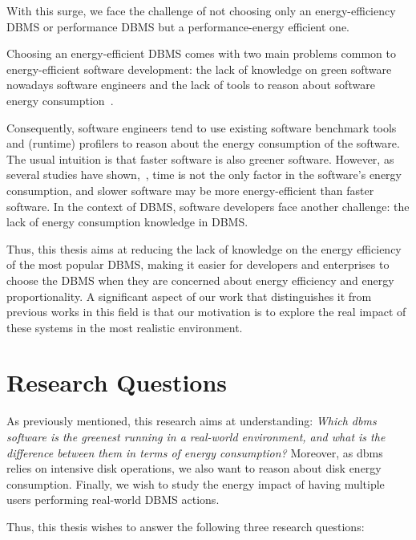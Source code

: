  With this surge, we face the challenge of not choosing only an energy-efficiency DBMS or performance DBMS but a performance-energy efficient one.
 
 
 Choosing an energy-efficient DBMS comes with two main problems common to energy-efficient software development: the lack of knowledge on green software nowadays software engineers and the lack of tools to reason about software energy consumption~\cite{10.1145/3154384,10.1145/2884781.2884810}. 

Consequently, software engineers tend to use existing software benchmark tools and (runtime) profilers to reason about the energy consumption of the software. The usual intuition is that faster software is also greener software. However, as several studies have shown,~\cite{10.1145/3125374.3125382},  time is not the only factor in the software's energy consumption, and slower software may be more energy-efficient than faster software. In the context of DBMS, software developers face another challenge: the lack of energy consumption knowledge in DBMS.



Thus, this thesis aims at reducing the lack of knowledge on the energy efficiency of the most popular DBMS, making it easier for developers and enterprises to choose the DBMS when they are concerned about energy efficiency and energy proportionality. A significant aspect of our work that distinguishes it from previous works in this field is that our motivation is to explore the real impact of these systems in the most realistic environment.


\section{Research Questions}
\label{sc:rq}


As previously mentioned, this research aims at understanding: \textit{Which \gls{dbms} software is the greenest running in a real-world environment, and what is the difference between them in terms of energy consumption?} Moreover, as \gls{dbms} relies on intensive disk operations, we also want to reason about disk energy consumption. Finally, we wish to study the energy impact of having multiple users performing real-world DBMS actions.

Thus, this thesis wishes to answer the following three research questions:


